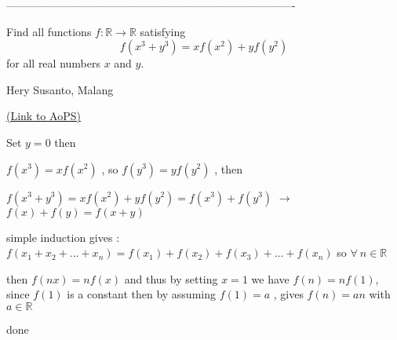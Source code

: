 -------------------------------------------------------------------------------

\begin{problem}
	Find all functions $ f: \mathbb{R} \rightarrow \mathbb{R}$ satisfying \[ f(x^3+y^3)=xf(x^2)+yf(y^2)\] for all real numbers $ x$ and $ y$.
\begin{italicized}Hery Susanto, Malang\end{italicized}
	\flushright \href{https://artofproblemsolving.com/community/c6h311512}{(Link to AoPS)}
\end{problem}



\begin{solution}
	Set $ y=0$ then

$ f(x^3)=xf(x^2)$ , so $ f(y^3)=yf(y^2)$ , then

$ f(x^3+y^3)=xf(x^2)+yf(y^2)=f(x^3)+f(y^3)$ $ \rightarrow$ $ f(x)+f(y)=f(x+y)$

simple induction gives : $ f(x_1+x_2+...+x_n)=f(x_1)+f(x_2)+f(x_3)+...+f(x_n)$  so $ \forall \ n\in\mathbb{R}$ 

then $ f(nx)=nf(x)$ and thus by setting $ x=1$ we have $ f(n)=nf(1)$, since $ f(1)$ is a constant then by assuming $ f(1)=a$ , gives $ f(n)=an$ with $ a\in\mathbb{R}$ 

done
\end{solution}



